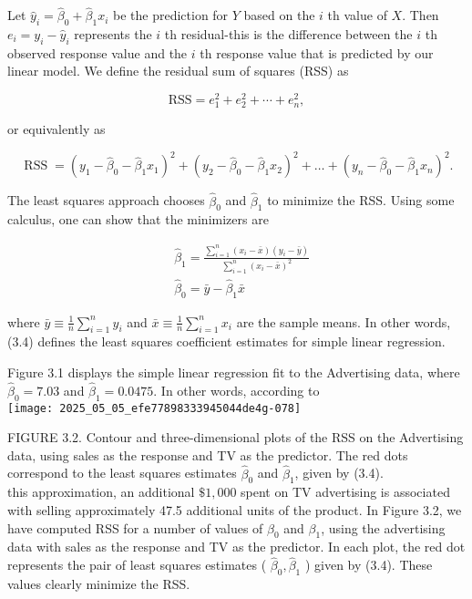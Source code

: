 \documentclass[10pt]{article}
\begin{document}
Let $\hat{y}_{i}=\hat{\beta}_{0}+\hat{\beta}_{1} x_{i}$ be the prediction for $Y$ based on the $i$ th value of $X$. Then $e_{i}=y_{i}-\hat{y}_{i}$ represents the $i$ th residual-this is the difference between the $i$ th observed response value and the $i$ th response value that is predicted by our linear model. We define the residual sum of squares (RSS) as

$$
\mathrm{RSS}=e_{1}^{2}+e_{2}^{2}+\cdots+e_{n}^{2},
$$

or equivalently as


\begin{equation*}
\operatorname{RSS}=\left(y_{1}-\hat{\beta}_{0}-\hat{\beta}_{1} x_{1}\right)^{2}+\left(y_{2}-\hat{\beta}_{0}-\hat{\beta}_{1} x_{2}\right)^{2}+\ldots+\left(y_{n}-\hat{\beta}_{0}-\hat{\beta}_{1} x_{n}\right)^{2} . \tag{3.3}
\end{equation*}


The least squares approach chooses $\hat{\beta}_{0}$ and $\hat{\beta}_{1}$ to minimize the RSS. Using some calculus, one can show that the minimizers are


\begin{align*}
& \hat{\beta}_{1}=\frac{\sum_{i=1}^{n}\left(x_{i}-\bar{x}\right)\left(y_{i}-\bar{y}\right)}{\sum_{i=1}^{n}\left(x_{i}-\bar{x}\right)^{2}}  \tag{3.4}\\
& \hat{\beta}_{0}=\bar{y}-\hat{\beta}_{1} \bar{x}
\end{align*}


where $\bar{y} \equiv \frac{1}{n} \sum_{i=1}^{n} y_{i}$ and $\bar{x} \equiv \frac{1}{n} \sum_{i=1}^{n} x_{i}$ are the sample means. In other words, (3.4) defines the least squares coefficient estimates for simple linear regression.

Figure 3.1 displays the simple linear regression fit to the Advertising data, where $\hat{\beta}_{0}=7.03$ and $\hat{\beta}_{1}=0.0475$. In other words, according to\\
\texttt{[image: 2025\_05\_05\_efe77898333945044de4g-078]}

FIGURE 3.2. Contour and three-dimensional plots of the RSS on the Advertising data, using sales as the response and TV as the predictor. The red dots correspond to the least squares estimates $\hat{\beta}_{0}$ and $\hat{\beta}_{1}$, given by (3.4).\\
this approximation, an additional $\$ 1,000$ spent on TV advertising is associated with selling approximately 47.5 additional units of the product. In Figure 3.2, we have computed RSS for a number of values of $\beta_{0}$ and $\beta_{1}$, using the advertising data with sales as the response and TV as the predictor. In each plot, the red dot represents the pair of least squares estimates ( $\hat{\beta}_{0}, \hat{\beta}_{1}$ ) given by (3.4). These values clearly minimize the RSS.
\end{document}
